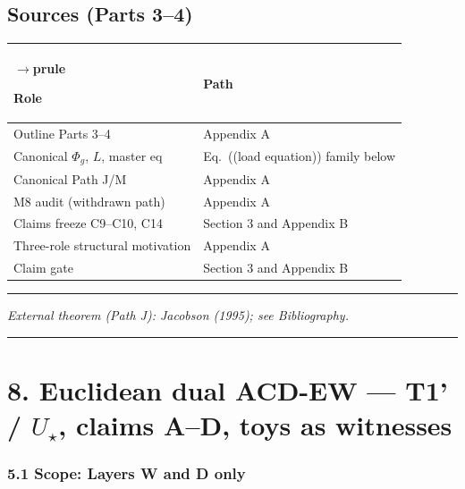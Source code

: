 \documentclass[
  11pt,
]{article}
\newcounter{none} %
\begin{document}
\subsection{Sources (Parts 3--4)}\label{sources-parts-34}

{\def\LTcaptype{none} %
\begin{longtable}[]{@{}
  >{\raggedright\arraybackslash}p{}
  >{\raggedright\arraybackslash}p{}@{}}
$\rightarrow$prule\noalign{}
\begin{minipage}[b]{\linewidth}\raggedright
Role
\end{minipage} & \begin{minipage}[b]{\linewidth}\raggedright
Path
\end{minipage} \\
\midrule\noalign{}
\endhead
\bottomrule\noalign{}
\endlastfoot
Outline Parts 3--4 & Appendix A \\
Canonical \(\Phi_g\), \(L\), master eq & Eq.~((load equation)) family below \\
Canonical Path J/M & Appendix A \\
M8 audit (withdrawn path) & Appendix A \\
Claims freeze C9--C10, C14 & Section 3 and Appendix B \\
Three-role structural motivation & Appendix A \\
Claim gate & Section 3 and Appendix B \\
\end{longtable}
}

\begin{center}\rule{0.5\linewidth}{0.5pt}\end{center}

\emph{External theorem (Path J): Jacobson (1995); see Bibliography.}

\begin{center}\rule{0.5\linewidth}{0.5pt}\end{center}

\section{\texorpdfstring{8. Euclidean dual ACD-EW --- T1' / \(U_\star\), claims A--D, toys as witnesses}{8. Euclidean dual ACD-EW --- T1' / U\_\textbackslash star, claims A--D, toys as witnesses}}\label{euclidean-dual-acd-ew-t1-u_star-claims-ad-toys-as-witnesses}

\subsubsection{5.1 Scope: Layers W and D only}\label{scope-layers-w-and-d-only}
\end{document}
